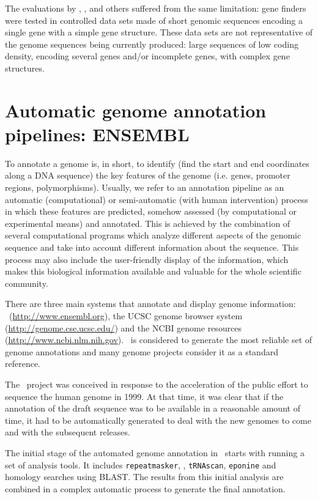 The evaluations by \cite{burset:1996a}, \cite{rogic:2001a}, and others
suffered from the same limitation: gene finders were tested in
controlled data sets made of short genomic sequences encoding a single
gene with a simple gene structure. These data sets are not
representative of the genome sequences being currently produced: large
sequences of low coding density, encoding several genes and/or
incomplete genes, with complex gene structures. 




\section{Automatic genome annotation pipelines: ENSEMBL}
\label{section ensembl}
To annotate a genome is, in short, to identify (find the start and end
coordinates along a DNA sequence) the key features of the genome
(i.e. genes, promoter regions, polymorphisms). Usually, we refer to an
annotation pipeline as an automatic (computational) or semi-automatic
(with human intervention) process in which these features are
predicted, somehow assessed (by computational or experimental means)
and annotated. This is achieved by the combination of several
computational programs which analyze different aspects of the genomic
sequence and take into account different information about the
sequence. This process may also include the user-friendly display of
the information, which makes this biological information available and
valuable for the whole scientific community.

There are three main systems that annotate and display genome information:
\ensembl\ (\url{http://www.ensembl.org}), the UCSC genome browser system 
(\url{http://genome.cse.ucsc.edu/}) and the NCBI genome resources
(\url{http://www.ncbi.nlm.nih.gov}). \ensembl\ is considered to
generate the most reliable set of genome annotations and many genome
projects consider it as a standard reference.

The \ensembl\ project was conceived in response to the acceleration of
the public effort to sequence the human genome in 1999. At that time,
it was clear that if the annotation of the draft sequence was to be
available in a reasonable amount of time, it had to be automatically
generated to deal with the new genomes to come and with the subsequent
releases.

The initial stage of the automated genome annotation in \ensembl\
starts with running a set of analysis tools. It includes 
\texttt{repeatmasker}, \genscan, \texttt{tRNAscan}, \texttt{eponine} 
and homology searches using BLAST. The results from this initial
analysis are combined in a complex automatic process to generate the
final annotation.


